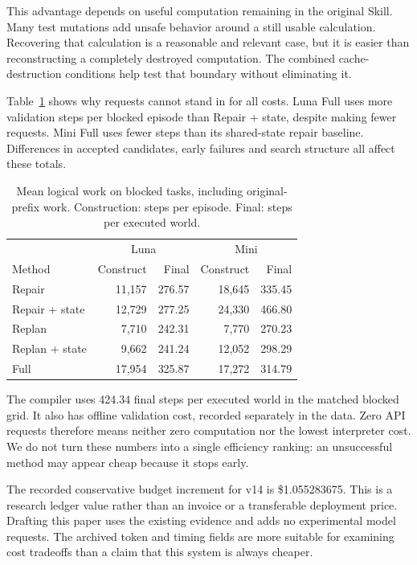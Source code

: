 \documentclass[conference]{IEEEtran}
\newcommand{\smalltable}{\fontsize{8}{9.5}\selectfont}
\begin{document}
This advantage depends on useful computation remaining in the original Skill. Many test mutations add unsafe behavior around a still usable calculation. Recovering that calculation is a reasonable and relevant case, but it is easier than reconstructing a completely destroyed computation. The combined cache-destruction conditions help test that boundary without eliminating it.

Table~\ref{tab:cost} shows why requests cannot stand in for all costs. Luna Full uses more validation steps per blocked episode than Repair + state, despite making fewer requests. Mini Full uses fewer steps than its shared-state repair baseline. Differences in accepted candidates, early failures and search structure all affect these totals.

\begin{table}[t]
\caption{Mean logical work on blocked tasks, including original-prefix work. Construction: steps per episode. Final: steps per executed world.}
\label{tab:cost}
\centering\smalltable
\begin{tabular}{lrrrr}
\toprule
&\multicolumn{2}{c}{Luna}&\multicolumn{2}{c}{Mini}\\
Method&Construct&Final&Construct&Final\\
\midrule
Repair&11,157&276.57&18,645&335.45\\
Repair + state&12,729&277.25&24,330&466.80\\
Replan&7,710&242.31&7,770&270.23\\
Replan + state&9,662&241.24&12,052&298.29\\
Full&17,954&325.87&17,272&314.79\\
\bottomrule
\end{tabular}
\end{table}

The compiler uses 424.34 final steps per executed world in the matched blocked grid. It also has offline validation cost, recorded separately in the data. Zero API requests therefore means neither zero computation nor the lowest interpreter cost. We do not turn these numbers into a single efficiency ranking: an unsuccessful method may appear cheap because it stops early.

The recorded conservative budget increment for v14 is \$1.055283675. This is a research ledger value rather than an invoice or a transferable deployment price. Drafting this paper uses the existing evidence and adds no experimental model requests. The archived token and timing fields are more suitable for examining cost tradeoffs than a claim that this system is always cheaper.
\end{document}
